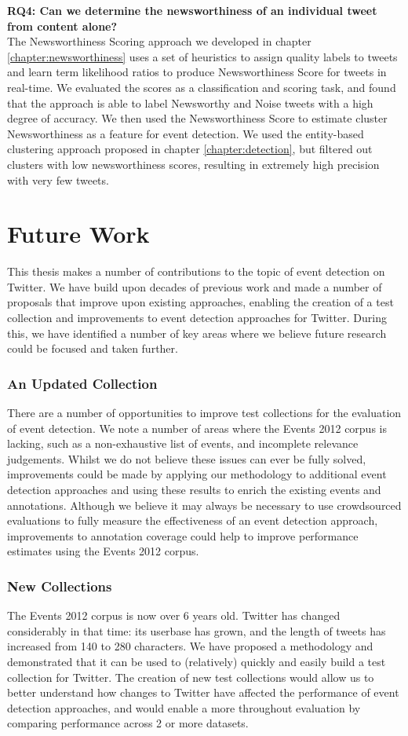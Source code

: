 \newpage
\textbf{RQ4: Can we determine the newsworthiness of an individual tweet from content alone?} \\
The Newsworthiness Scoring approach we developed in chapter \ref{chapter:newsworthiness} uses a set of heuristics to assign quality labels to tweets and learn term likelihood ratios to produce Newsworthiness Score for tweets in real-time.
We evaluated the scores as a classification and scoring task, and found that the approach is able to label Newsworthy and Noise tweets with a high degree of accuracy.
We then used the Newsworthiness Score to estimate cluster Newsworthiness as a feature for event detection.
We used the entity-based clustering approach proposed in chapter \ref{chapter:detection}, but filtered out clusters with low newsworthiness scores, resulting in extremely high precision with very few tweets.

\section{Future Work}
This thesis makes a number of contributions to the topic of event detection on Twitter.
We have build upon decades of previous work and made a number of proposals that improve upon existing approaches, enabling the creation of a test collection and improvements to event detection approaches for Twitter.
During this, we have identified a number of key areas where we believe future research could be focused and taken further.

\subsubsection{An Updated Collection} There are a number of opportunities to improve  test collections for the evaluation of event detection.
We note a number of areas where the Events 2012 corpus is lacking, such as a non-exhaustive list of events, and incomplete relevance judgements.
Whilst we do not believe these issues can ever be fully solved, improvements could be made by applying our methodology to additional event detection approaches and using these results to enrich the existing events and annotations.
Although we believe it may always be necessary to use crowdsourced evaluations to fully measure the effectiveness of an event detection approach, improvements to annotation coverage could help to improve performance estimates using the Events 2012 corpus.

\subsubsection{New Collections}
The Events 2012 corpus is now over 6 years old.
Twitter has changed considerably in that time: its userbase has grown, and the length of tweets has increased from 140 to 280 characters.
We have proposed a methodology and demonstrated that it can be used to (relatively) quickly and easily build a test collection for Twitter.
The creation of new test collections would allow us to better understand how changes to Twitter have affected the performance of event detection approaches, and would enable a more throughout evaluation by comparing performance across 2 or more datasets.



